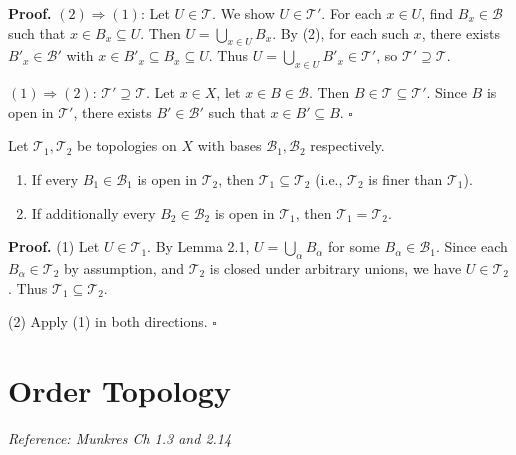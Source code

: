 \documentclass[11pt]{report}
\renewenvironment{proof}[1][Proof]{\noindent\textbf{#1.} }{\hfill$\square$\par\vspace{5pt}}
\begin{document}
\begin{proof}
$(2) \Rightarrow (1)$: Let $U \in \mathcal{T}$. We show $U \in \mathcal{T}'$. For each $x \in U$, find $B_x \in \mathcal{B}$ such that $x \in B_x \subseteq U$. Then $U = \bigcup_{x \in U} B_x$. By (2), for each such $x$, there exists $B'_x \in \mathcal{B}'$ with $x \in B'_x \subseteq B_x \subseteq U$. Thus $U = \bigcup_{x \in U} B'_x \in \mathcal{T}'$, so $\mathcal{T}' \supseteq \mathcal{T}$.

$(1) \Rightarrow (2)$: $\mathcal{T}' \supseteq \mathcal{T}$. Let $x \in X$, let $x \in B \in \mathcal{B}$. Then $B \in \mathcal{T} \subseteq \mathcal{T}'$. Since $B$ is open in $\mathcal{T}'$, there exists $B' \in \mathcal{B}'$ such that $x \in B' \subseteq B$.
\end{proof}

\begin{corbox}
Let $\mathcal{T}_1, \mathcal{T}_2$ be topologies on $X$ with bases $\mathcal{B}_1, \mathcal{B}_2$ respectively.
\begin{enumerate}
    \item If every $B_1 \in \mathcal{B}_1$ is open in $\mathcal{T}_2$, then $\mathcal{T}_1 \subseteq \mathcal{T}_2$ (i.e., $\mathcal{T}_2$ is finer than $\mathcal{T}_1$).
    \item If additionally every $B_2 \in \mathcal{B}_2$ is open in $\mathcal{T}_1$, then $\mathcal{T}_1 = \mathcal{T}_2$.
\end{enumerate}
\end{corbox}

\begin{proof}
(1) Let $U \in \mathcal{T}_1$. By Lemma 2.1, $U = \bigcup_{\alpha} B_\alpha$ for some $B_\alpha \in \mathcal{B}_1$. Since each $B_\alpha \in \mathcal{T}_2$ by assumption, and $\mathcal{T}_2$ is closed under arbitrary unions, we have $U \in \mathcal{T}_2$. Thus $\mathcal{T}_1 \subseteq \mathcal{T}_2$.

(2) Apply (1) in both directions.
\end{proof}

\section{Order Topology}

\textit{Reference: Munkres Ch 1.3 and 2.14}
\end{document}
